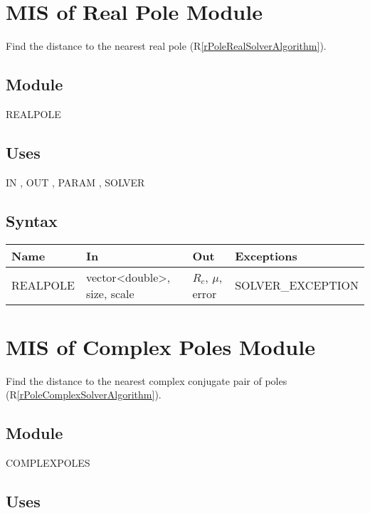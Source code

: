 \documentclass[12pt, titlepage]{article}
\newcommand{\rref}[1]{(R\ref{#1})}
\begin{document}
\section{MIS of Real Pole Module} \label{sc:MIS_POLEREALSOLVERMODULE}

Find the distance to the nearest real pole \rref{rPoleRealSolverAlgorithm}.

\subsection{Module}

REALPOLE

\subsection{Uses}

IN , OUT , PARAM , SOLVER 

\subsection{Syntax}

\begin{tabular}{p{3cm} p{5cm} p{3cm} >{\raggedright\arraybackslash}p{5cm}}
\toprule
\textbf{Name} & \textbf{In} & \textbf{Out} & \textbf{Exceptions} \\
\midrule
  REALPOLE & vector<double>, size, scale &  $R_c$, $\mu$, error & SOLVER\_EXCEPTION \\
\bottomrule
\end{tabular}

\section{MIS of Complex Poles Module} \label{sc:MIS_POLECOMPLEXSOLVERMODULE}

Find the distance to the nearest complex conjugate pair of poles \rref{rPoleComplexSolverAlgorithm}.

\subsection{Module}

COMPLEXPOLES

\subsection{Uses}
\end{document}
